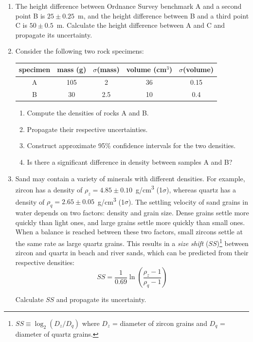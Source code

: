 \begin{enumerate}
  
\item The height difference between Ordnance Survey benchmark A and a
  second point B is $25\pm0.25$~m, and the height difference between B
  and a third point C is $50\pm0.5$~m. Calculate the height difference
  between A and C and propagate its uncertainty.
  
\item Consider the following two rock specimens:

\begin{tabular}{ccccc}
specimen & mass (g) & $\sigma$(mass) & volume (cm$^3$) & $\sigma$(volume) \\
\hline 
A & 105 & 2 & 36 & 0.15\\
B & 30 & 2.5 & 10 & 0.4
\end{tabular}

\begin{enumerate}
\item Compute the densities of rocks A and B.
\item Propagate their respective uncertainties.
\item Construct approximate 95\% confidence intervals for the two densities.
\item Is there a significant difference in density between samples A and B?
\end{enumerate}

\item Sand may contain a variety of minerals with different densities.
  For example, zircon has a density of
  $\rho_z=4.85\pm0.10$~g/cm\textsuperscript{3} (1$\sigma$), whereas
  quartz has a density of $\rho_q=2.65\pm0.05$~g/cm\textsuperscript{3}
  (1$\sigma$).  The settling velocity of sand grains in water depends
  on two factors: density and grain size. Dense grains settle more
  quickly than light ones, and large grains settle more quickly than
  small ones. When a balance is reached between these two factors,
  small zircons settle at the same rate as large quartz grains. This
  results in a \emph{size shift} ($SS$)\footnote{$SS \equiv
    \log_2(D_z/D_q)$ where $D_z$ = diameter of zircon grains and $D_q$
    = diameter of quartz grains.} between zircon and quartz in beach
  and river sands, which can be predicted from their respective
  densities:
\[
SS = \frac{1}{0.69}\ln\left(\frac{\rho_z-1}{\rho_q-1}\right)
\]

Calculate $SS$ and propagate its uncertainty.


\end{enumerate}
